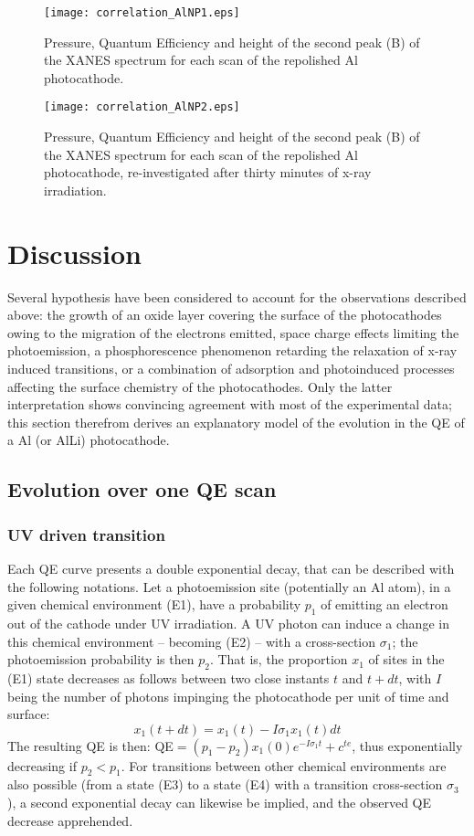 \documentclass[aip,graphicx]{revtex4-1}
\begin{document}
\begin{figure}
\texttt{[image: correlation\_AlNP1.eps]}%
\caption{Pressure, Quantum Efficiency and height of the second peak (B) of the XANES spectrum for each scan of the repolished Al photocathode.\label{correlation_AlNP1}}%
\end{figure}

\begin{figure}
\texttt{[image: correlation\_AlNP2.eps]}%
\caption{Pressure, Quantum Efficiency and height of the second peak (B) of the XANES spectrum for each scan of the repolished Al photocathode, re-investigated after thirty minutes of x-ray irradiation.\label{correlation_AlNP2}}%
\end{figure}


\section{Discussion}

Several hypothesis have been considered to account for the observations described above: the growth of an oxide layer covering the surface of the photocathodes owing to the migration of the electrons emitted, space charge effects limiting the photoemission, a phosphorescence phenomenon retarding the relaxation of x-ray induced transitions, or a combination of adsorption and photoinduced processes affecting the surface chemistry of the photocathodes. Only the latter interpretation shows convincing agreement with most of the experimental data; this section therefrom derives an explanatory model of the evolution in the QE of a Al (or AlLi) photocathode.

\subsection{Evolution over one QE scan}

\subsubsection*{UV driven transition}
Each QE curve presents a double exponential decay, that can be described with the following notations. Let a photoemission site (potentially an Al atom), in a given chemical environment (E1), have a probability $p_1$ of emitting an electron out of the cathode under UV irradiation. A UV photon can induce a change in this chemical environment -- becoming (E2) -- with a cross-section $\sigma_1$; the photoemission probability is then $p_2$. That is, the proportion $x_1$ of sites in the (E1) state decreases as follows between two close instants $t$ and $t+dt$, with $I$ being the number of photons impinging the photocathode per unit of time and surface:
\begin{equation}
x_1(t+dt)=x_1(t)-I\sigma_1x_1(t)dt
\end{equation}
The resulting QE is then: QE$=(p_1-p_2)x_1(0)e^{-I\sigma_1t}+c^{te}$, thus exponentially decreasing if $p_2<p_1$. For transitions between other chemical environments are also possible (from a state (E3) to a state (E4) with a transition cross-section $\sigma_3$), a second exponential decay can likewise be implied, and the observed QE decrease apprehended.
\end{document}
